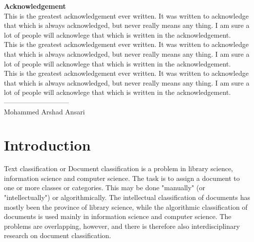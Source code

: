 \documentclass[12pt]{book}
\begin{document}
\begin{center}

    \fontsize{14}{60}\selectfont \textbf{Acknowledgement}\\
    \vspace{5mm}
    \fontsize{12}{20}\selectfont This is the greatest acknowledgement ever written. It was written to acknowledge that which is always acknowledged, but never really means any thing. I am sure a lot of people will acknowlege that which is written in the acknowledgement.\\

    \vspace{5mm}
    \fontsize{12}{20}\selectfont This is the greatest acknowledgement ever written. It was written to acknowledge that which is always acknowledged, but never really means any thing. I am sure a lot of people will acknowlege that which is written in the acknowledgement.\\

    \vspace{5mm}
    \fontsize{12}{20}\selectfont This is the greatest acknowledgement ever written. It was written to acknowledge that which is always acknowledged, but never really means any thing. I am sure a lot of people will acknowlege that which is written in the acknowledgement.\\
    
    \vspace{60mm}
    \noindent\hfill \fontsize{14}{20}\selectfont -----------------------------\\
    \noindent\hfill \fontsize{14}{20}\selectfont Mohammed Arshad Ansari
\end{center}

\tableofcontents


\listoffigures

\listoftables

\clearpage


\chapter{Introduction}

Text classification or Document classification is a problem in library science, information science and computer science. The task is to assign a document to one or more classes or categories. This may be done "manually" (or "intellectually") or algorithmically. The intellectual classification of documents has mostly been the province of library science, while the algorithmic classification of documents is used mainly in information science and computer science. The problems are overlapping, however, and there is therefore also interdisciplinary research on document classification.
\end{document}
